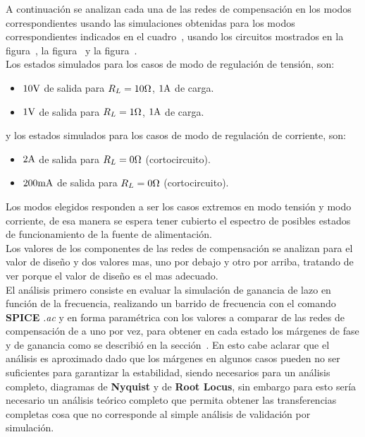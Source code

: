 
A continuación se analizan cada una de las redes de compensación en los modos correspondientes usando las simulaciones obtenidas para los modos correspondientes indicados en el cuadro~, usando los circuitos mostrados en la figura~, la figura~ y la figura~.\\

Los estados simulados para los casos de modo de regulación de tensión, son:

\begin{itemize}
\item $10 \si[per-mode=symbol]{\volt}$ de salida para $R_{L} = 10 \si[per-mode=symbol]{\ohm}$, $1 \si[per-mode=symbol]{\ampere}$ de carga.

\item $1 \si[per-mode=symbol]{\volt}$ de salida para $R_{L} = 1 \si[per-mode=symbol]{\ohm}$, $1 \si[per-mode=symbol]{\ampere}$ de carga.
\end{itemize}

y los estados simulados para los casos de modo de regulación de corriente, son:

\begin{itemize}
\item $2 \si[per-mode=symbol]{\ampere}$ de salida para $R_{L} = 0 \si[per-mode=symbol]{\ohm}$ (cortocircuito).

\item $200 \si[per-mode=symbol]{\milli\ampere}$ de salida para $R_{L} = 0 \si[per-mode=symbol]{\ohm}$ (cortocircuito).
\end{itemize}



Los modos elegidos responden a ser los casos extremos en modo tensión y modo corriente, de esa manera se espera tener cubierto el espectro de posibles estados de funcionamiento de la fuente de alimentación.\\

Los valores de los componentes de las redes de compensación se analizan para el valor de diseño y dos valores mas, uno por debajo y otro por arriba, tratando de ver porque el valor de diseño es el mas adecuado.\\

El análisis primero consiste en evaluar la simulación de ganancia de lazo en función de la frecuencia, realizando un barrido de frecuencia con el comando \textbf{SPICE} \textit{.ac} y en forma paramétrica con los valores a comparar de las redes de compensación de a uno por vez, para obtener en cada estado los márgenes de fase y de ganancia como se describió en la sección~. En esto cabe aclarar que el análisis es aproximado dado que los márgenes en algunos casos pueden no ser suficientes para garantizar la estabilidad, siendo necesarios para un análisis completo, diagramas de \textbf{Nyquist} y de \textbf{Root Locus}, sin embargo para esto sería necesario un análisis teórico completo que permita obtener las transferencias completas cosa que no corresponde al simple análisis de validación por simulación.\\


